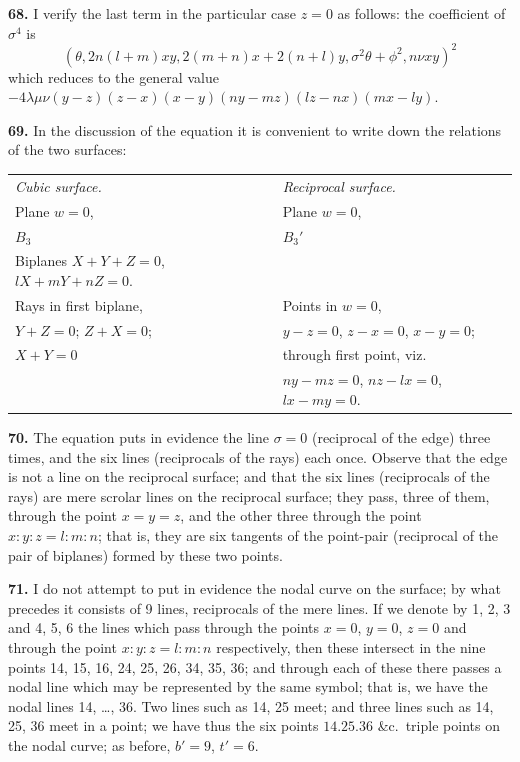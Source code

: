\documentclass[11pt,a4paper]{article}
\theoremstyle{definition}
\begin{document}
\textbf{68.} I verify the last term in the particular case $z = 0$ as follows: the coefficient of $\sigma^4$ is
\[
(\theta, 2n(l + m)xy, 2(m + n)x + 2(n + l)y, \sigma^2\theta + \phi^2, n\nu xy)^2
\]
which reduces to the general value $-4\lambda\mu\nu(y - z)(z - x)(x - y)(ny - mz)(lz - nx)(mx - ly)$.

\textbf{69.} In the discussion of the equation it is convenient to write down the relations of the two surfaces:
\begin{center}
\begin{tabular}{ll}
\textit{Cubic surface.} & \textit{Reciprocal surface.} \\
Plane $w = 0$, & Plane $w = 0$, \\
$B_3$ & $B_3'$ \\
Biplanes $X + Y + Z = 0$, $lX + mY + nZ = 0$. & \\
Rays in first biplane, & Points in $w = 0$, \\
$Y + Z = 0$; $Z + X = 0$; & $y - z = 0$, $z - x = 0$, $x - y = 0$; \\
$X + Y = 0$ & through first point, viz. \\
& $ny - mz = 0$, $nz - lx = 0$, $lx - my = 0$.
\end{tabular}
\end{center}

\textbf{70.} The equation puts in evidence the line $\sigma = 0$ (reciprocal of the edge) three times, and the six lines (reciprocals of the rays) each once. Observe that the edge is not a line on the reciprocal surface; and that the six lines (reciprocals of the rays) are mere scrolar lines on the reciprocal surface; they pass, three of them, through the point $x = y = z$, and the other three through the point $x : y : z = l : m : n$; that is, they are six tangents of the point-pair (reciprocal of the pair of biplanes) formed by these two points.

\textbf{71.} I do not attempt to put in evidence the nodal curve on the surface; by what precedes it consists of 9 lines, reciprocals of the mere lines. If we denote by 1, 2, 3 and 4, 5, 6 the lines which pass through the points $x = 0$, $y = 0$, $z = 0$ and through the point $x : y : z = l : m : n$ respectively, then these intersect in the nine points 14, 15, 16, 24, 25, 26, 34, 35, 36; and through each of these there passes a nodal line which may be represented by the same symbol; that is, we have the nodal lines 14, \ldots, 36. Two lines such as 14, 25 meet; and three lines such as 14, 25, 36 meet in a point; we have thus the six points $14.25.36$ \&c.\ triple points on the nodal curve; as before, $b' = 9$, $t' = 6$.
\end{document}
